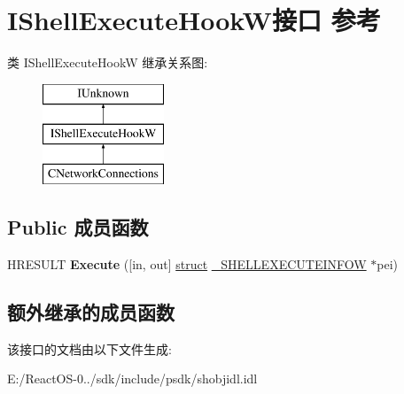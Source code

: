 \hypertarget{interface_i_shell_execute_hook_w}{}\section{I\+Shell\+Execute\+Hook\+W接口 参考}
\label{interface_i_shell_execute_hook_w}
类 I\+Shell\+Execute\+HookW 继承关系图\+:\begin{figure}[H]
\begin{center}
\leavevmode
\includegraphics[height=3.000000cm]{interface_i_shell_execute_hook_w}
\end{center}
\end{figure}
\subsection*{Public 成员函数}
\begin{DoxyCompactItemize}
\item 
\mbox{\label{interface_i_shell_execute_hook_w_ac9a28538a2f10dd59a90adb8b3a2dcb8}} 
H\+R\+E\+S\+U\+LT {\bfseries Execute} (\mbox{[}in, out\mbox{]} \hyperlink{interfacestruct}{struct} \hyperlink{struct___s_h_e_l_l_e_x_e_c_u_t_e_i_n_f_o_w}{\+\_\+\+S\+H\+E\+L\+L\+E\+X\+E\+C\+U\+T\+E\+I\+N\+F\+OW} $\ast$pei)
\end{DoxyCompactItemize}
\subsection*{额外继承的成员函数}


该接口的文档由以下文件生成\+:\begin{DoxyCompactItemize}
\item 
E\+:/\+React\+O\+S-\/0../sdk/include/psdk/shobjidl.\+idl\end{DoxyCompactItemize}
